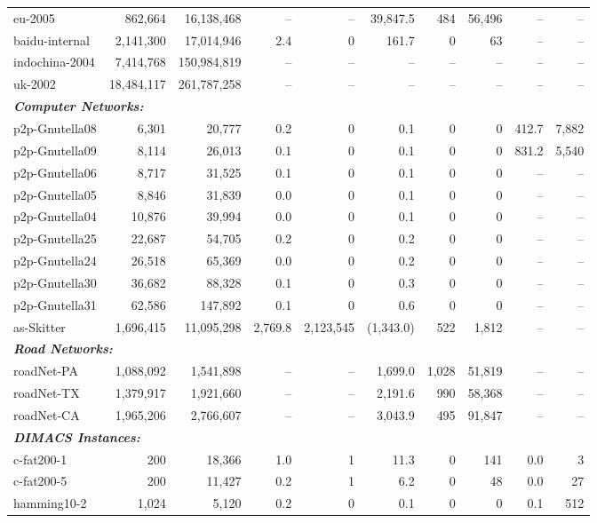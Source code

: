 \documentclass[11pt]{article}
\begin{document}
{\begin{table}[p]
\begin{tabular}{lrr|rr|rrr|rr}
eu-2005 & 862,664 & 16,138,468 & -- & -- & 39,847.5 & 484 & 56,496 & -- & -- \\
baidu-internal & 2,141,300 & 17,014,946 & 2.4 & 0 & 161.7 & 0 & 63 & -- & -- \\
indochina-2004 & 7,414,768 & 150,984,819 & -- & -- & -- & -- & -- & -- & -- \\
uk-2002 & 18,484,117 & 261,787,258 & -- & -- & -- & -- & -- & -- & -- \\
\midrule \multicolumn{4}{l}{\textbf{\textit{Computer Networks:}}} \\
p2p-Gnutella08 & 6,301 & 20,777 & 0.2 & 0 & 0.1 & 0 & 0 & 412.7 & 7,882 \\
p2p-Gnutella09 & 8,114 & 26,013 & 0.1 & 0 & 0.1 & 0 & 0 & 831.2 & 5,540 \\
p2p-Gnutella06 & 8,717 & 31,525 & 0.1 & 0 & 0.1 & 0 & 0 & -- & -- \\
p2p-Gnutella05 & 8,846 & 31,839 & 0.0 & 0 & 0.1 & 0 & 0 & -- & -- \\
p2p-Gnutella04 & 10,876 & 39,994 & 0.0 & 0 & 0.1 & 0 & 0 & -- & -- \\
p2p-Gnutella25 & 22,687 & 54,705 & 0.2 & 0 & 0.2 & 0 & 0 & -- & -- \\
p2p-Gnutella24 & 26,518 & 65,369 & 0.0 & 0 & 0.2 & 0 & 0 & -- & -- \\
p2p-Gnutella30 & 36,682 & 88,328 & 0.1 & 0 & 0.3 & 0 & 0 & -- & -- \\
p2p-Gnutella31 & 62,586 & 147,892 & 0.1 & 0 & 0.6 & 0 & 0 & -- & -- \\
as-Skitter & 1,696,415 & 11,095,298 & 2,769.8 & 2,123,545 & (1,343.0) & 522 & 1,812 & -- & -- \\
\midrule \multicolumn{4}{l}{\textbf{\textit{Road Networks:}}} \\
roadNet-PA & 1,088,092 & 1,541,898 & -- & -- & 1,699.0 & 1,028 & 51,819 & -- & -- \\
roadNet-TX & 1,379,917 & 1,921,660 & -- & -- & 2,191.6 & 990 & 58,368 & -- & -- \\
roadNet-CA & 1,965,206 & 2,766,607 & -- & -- & 3,043.9 & 495 & 91,847 & -- & -- \\
\midrule \multicolumn{4}{l}{\textbf{\textit{DIMACS Instances:}}} \\
c-fat200-1 & 200 & 18,366 & 1.0 & 1 & 11.3 & 0 & 141 & 0.0 & 3 \\
c-fat200-5 & 200 & 11,427 & 0.2 & 1 & 6.2 & 0 & 48 & 0.0 & 27 \\
hamming10-2 & 1,024 & 5,120 & 0.2 & 0 & 0.1 & 0 & 0 & 0.1 & 512 \\

\end{tabular}
\end{table}}
\end{document}

